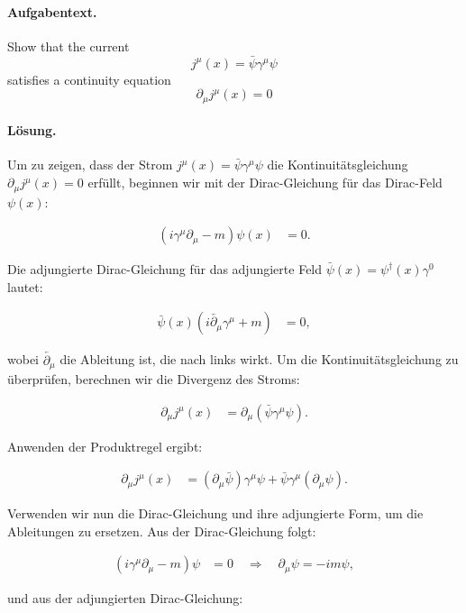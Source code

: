 \documentclass[11pt,a4paper]{article}
\begin{document}
\paragraph{Aufgabentext.}
Show that the current
$$
j^\mu(x)=\bar{\psi} \gamma^\mu \psi
$$
satisfies a continuity equation
$$
\partial_\mu j^\mu(x)=0
$$

\paragraph{Lösung.}
Um zu zeigen, dass der Strom \( j^\mu(x) = \bar{\psi} \gamma^\mu \psi \) die Kontinuitätsgleichung \(\partial_\mu j^\mu(x) = 0\) erfüllt, beginnen wir mit der Dirac-Gleichung für das Dirac-Feld \(\psi(x)\):

\begin{align*}
(i \gamma^\mu \partial_\mu - m) \psi(x) &= 0.
\end{align*}

Die adjungierte Dirac-Gleichung für das adjungierte Feld \(\bar{\psi}(x) = \psi^\dagger(x) \gamma^0\) lautet:

\begin{align*}
\bar{\psi}(x) (i \overleftarrow{\partial_\mu} \gamma^\mu + m) &= 0,
\end{align*}

wobei \(\overleftarrow{\partial_\mu}\) die Ableitung ist, die nach links wirkt. Um die Kontinuitätsgleichung zu überprüfen, berechnen wir die Divergenz des Stroms:

\begin{align*}
\partial_\mu j^\mu(x) &= \partial_\mu (\bar{\psi} \gamma^\mu \psi).
\end{align*}

Anwenden der Produktregel ergibt:

\begin{align*}
\partial_\mu j^\mu(x) &= (\partial_\mu \bar{\psi}) \gamma^\mu \psi + \bar{\psi} \gamma^\mu (\partial_\mu \psi).
\end{align*}

Verwenden wir nun die Dirac-Gleichung und ihre adjungierte Form, um die Ableitungen zu ersetzen. Aus der Dirac-Gleichung folgt:

\begin{align*}
(i \gamma^\mu \partial_\mu - m) \psi &= 0 \quad \Rightarrow \quad \partial_\mu \psi = -i m \psi,
\end{align*}

und aus der adjungierten Dirac-Gleichung:
\end{document}
